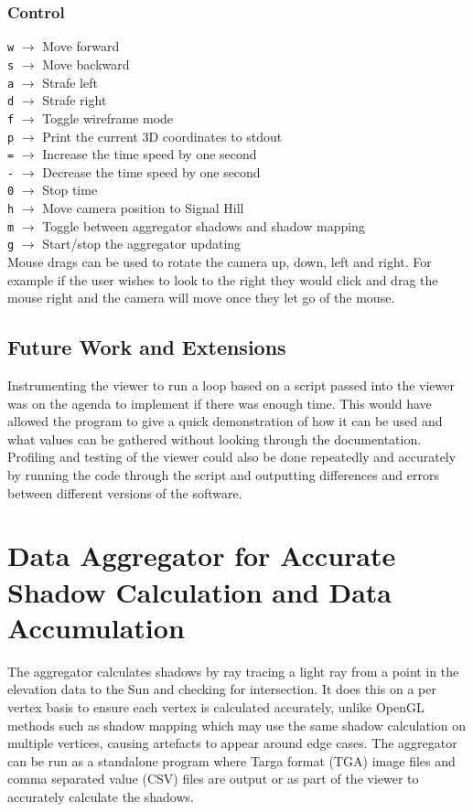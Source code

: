 \documentclass[12pt]{report}
\begin{document}
\subsection{Control}

\texttt{w} $\rightarrow$ Move forward\\
\texttt{s} $\rightarrow$ Move backward\\
\texttt{a} $\rightarrow$ Strafe left\\
\texttt{d} $\rightarrow$ Strafe right\\
\texttt{f} $\rightarrow$ Toggle wireframe mode\\
\texttt{p} $\rightarrow$ Print the current 3D coordinates to stdout\\
\texttt{=} $\rightarrow$ Increase the time speed by one second\\
\texttt{-} $\rightarrow$ Decrease the time speed by one second\\
\texttt{0} $\rightarrow$ Stop time\\
\texttt{h} $\rightarrow$ Move camera position to Signal Hill\\
\texttt{m} $\rightarrow$ Toggle between aggregator shadows and shadow mapping\\
\texttt{g} $\rightarrow$ Start/stop the aggregator updating\\

Mouse drags can be used to rotate the camera up, down, left and right. For example if the user wishes to look to the right they would click and drag the mouse right and the camera will move once they let go of the mouse.

\section{Future Work and Extensions}
Instrumenting the viewer to run a loop based on a script passed into the viewer was on the agenda to implement if there was enough time. This would have allowed the program to give a quick demonstration of how it can be used and what values can be gathered without looking through the documentation. Profiling and testing of the viewer could also be done repeatedly and accurately by running the code through the script and outputting differences and errors between different versions of the software.

\chapter{Data Aggregator for Accurate Shadow Calculation and Data Accumulation}
The aggregator calculates shadows by ray tracing a light ray from a point in the elevation data to the Sun and checking for intersection. It does this on a per vertex basis to ensure each vertex is calculated accurately, unlike OpenGL methods such as shadow mapping which may use the same shadow calculation on multiple vertices, causing artefacts to appear around edge cases. The aggregator can be run as a standalone program where Targa format (TGA) image files and comma separated value (CSV) files are output or as part of the viewer to accurately calculate the shadows.
\end{document}

